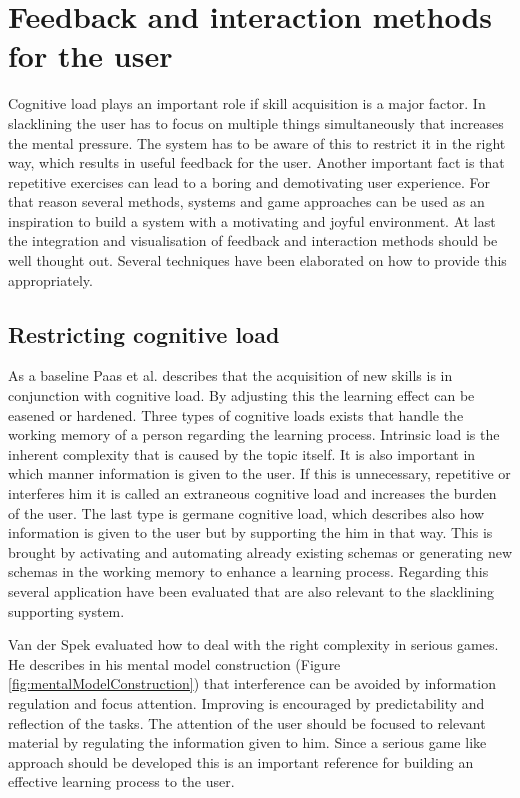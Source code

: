 \section{Feedback and interaction methods for the user}

Cognitive load plays an important role if skill acquisition is a major factor. In slacklining the user has to focus on multiple things simultaneously that increases the mental pressure. The system has to be aware of this to restrict it in the right way, which results in useful feedback for the user. Another important fact is that repetitive exercises can lead to a boring and demotivating user experience. For that reason several methods, systems and game approaches can be used as an inspiration to build a system with a motivating and joyful environment. At last the integration and visualisation of feedback and interaction methods should be well thought out. Several techniques have been elaborated on how to provide this appropriately.

\subsection{Restricting cognitive load}

As a baseline Paas et al. \cite{Paas2003-xt} describes that the acquisition of new skills is in conjunction with cognitive load. By adjusting this the learning effect can be easened or hardened. Three types of cognitive loads exists that handle the working memory of a person regarding the learning process. Intrinsic load is the inherent complexity that is caused by the topic itself. It is also important in which manner information is given to the user. If this is unnecessary, repetitive or interferes him it is called an extraneous cognitive load and increases the burden of the user. The last type is germane cognitive load, which describes also how information is given to the user but by supporting the him in that way. This is brought by activating and automating already existing schemas or generating new schemas in the working memory to enhance a learning process. Regarding this several application have been evaluated that are also relevant to the slacklining supporting system.

Van der Spek \cite{Van_der_Spek2010-fe} evaluated how to deal with the right complexity in serious games. He describes in his mental model construction (Figure \ref{fig:mentalModelConstruction}) that interference can be avoided by information regulation and focus attention. Improving is encouraged by predictability and reflection of the tasks. The attention of the user should be focused to relevant material by regulating the information given to him. Since a serious game like approach should be developed this is an important reference for building an effective learning process to the user.

